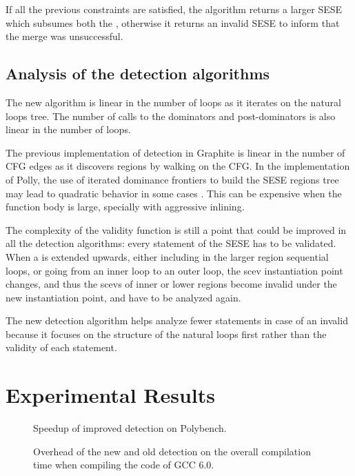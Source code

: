 \documentclass{sig-alternate}
\begin{document}
If all the previous constraints are satisfied, the algorithm returns a larger
SESE which subsumes both the , otherwise it returns an invalid SESE to
inform that the merge was unsuccessful.

\subsection{Analysis of the \SCoP{} detection algorithms}
The new algorithm is linear in the number of loops as it iterates on the
natural loops tree.  The number of calls to the dominators and post-dominators
is also linear in the number of loops.

The previous implementation of \SCoP{} detection in Graphite is linear in the
number of CFG edges as it discovers regions by walking on the CFG.  In the
implementation of Polly, the use of iterated dominance frontiers to build the
SESE regions tree may lead to quadratic behavior in some cases \cite{ramalingam}.
This can be expensive when the function body is large, specially with aggressive
inlining.

The complexity of the validity function is still a point that could be improved
in all the \SCoP{} detection algorithms: every statement of the SESE has to be
validated.  When a \SCoP{} is extended upwards, either including in the larger
region sequential loops, or going from an inner loop to an outer loop, the scev
instantiation point changes, and thus the scevs of inner or lower regions become
invalid under the new instantiation point, and have to be analyzed again.

The new \SCoP{} detection algorithm helps analyze fewer statements in case of an
invalid \SCoP{} because it focuses on the structure of the natural loops first
rather than the validity of each statement.

\section{Experimental Results}

\begin {figure}
  \begin{center}
    \resizebox{\linewidth}{!}{}
  \end{center}
  \caption{Speedup of improved \SCoP{} detection on Polybench.}
  \label{fig:polybench-speedup}
\end {figure}

\begin {figure}
  \begin{center}
    \resizebox{\linewidth}{!}{}
  \end{center}
  \caption{Overhead of the new and old \SCoP{} detection on the overall compilation
    time when compiling the code of GCC 6.0.}
  \label{fig:gcc-speedup}
\end {figure}
\end{document}

